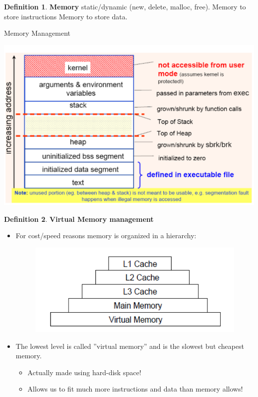 \documentclass[12pt,a4paper]{article}
\theoremstyle{definition}
\newtheorem{definition}{Definition}[section]
\newenvironment{myitemize}
{ \begin{itemize}
    \setlength{\itemsep}{5pt}
    \setlength{\parskip}{0pt}
    \setlength{\parsep}{0pt}     }
{ \end{itemize}                  }
\begin{document}
\begin{definition}{\textbf{Memory}}
	static/dynamic (\textsf{new, delete, malloc, free}). Memory to store instructions
Memory to store data.
\end{definition}

\begin{tcolorbox}
	\textsf{Memory Management}
	
	\includegraphics[scale=0.3]{m1/memoryManagement}
	\centering
\end{tcolorbox}

\begin{definition}{\textbf{Virtual Memory management}}
\begin{myitemize}
	\item For cost/speed reasons memory is organized in a hierarchy:
	\begin{figure}[h!]
		\includegraphics[scale=0.6]{m1/memoryHirarchy}
		\centering
	\end{figure}
	\item The lowest level is called ''virtual memory'' and is the slowest but cheapest memory.
	\begin{myitemize}
	\item Actually made using hard-disk space!
	\item Allows us to fit much more instructions and data than memory allows!
	\end{myitemize}
\end{myitemize}
\end{definition}
\end{document}
